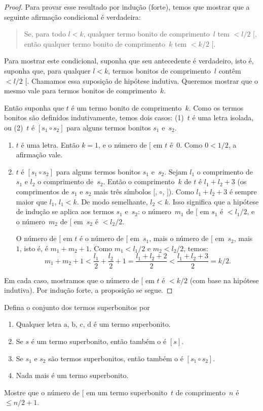 \documentclass[../../../include/open-logic-section]{subfiles}
\begin{document}
\begin{proof}
Para provar esse resultado por indução (forte), temos que mostrar que a
seguinte afirmação condicional é verdadeira:
\begin{quote}
  Se, para todo $l < k$, qualquer termo bonito de comprimento~$l$ tem $< l/2$
  $[$, então qualquer termo bonito de comprimento~$k$ tem $< k/2$ $[$.
\end{quote}
Para mostrar este condicional, suponha que seu antecedente é verdadeiro, isto é,
suponha que, para qualquer $l<k$, termos bonitos de comprimento~$l$ contêm $< l/2$
$[$.  Chamamos essa suposição de hipótese indutiva. Queremos
mostrar que o mesmo vale para termos bonitos de comprimento~$k$.

Então suponha que $t$ é um termo bonito de comprimento~$k$.  Como os termos bonitos são
definidos indutivamente, temos dois casos: (1)~$t$ é uma letra
isolada, ou (2)~$t$ é $[s_1 \circ s_2]$ para alguns termos bonitos $s_1$ e~$s_2$.
\begin{enumerate}
\item $t$ é uma letra.  Então $k = 1$, e o número de $[$ em $t$
é~$0$. Como $0 < 1/2$, a afirmação vale.
\item $t$ é $[s_1 \circ s_2]$ para alguns termos bonitos $s_1$ e~$s_2$.
  Sejam $l_1$ o comprimento de~$s_1$ e $l_2$ o comprimento
  de~$s_2$.  Então o comprimento~$k$ de $t$ é $l_1+l_2+3$ (os comprimentos de
  $s_1$ e $s_2$ mais três símbolos $[$, $\circ$, $]$). Como
  $l_1+l_2+3$ é sempre maior que $l_1$, $l_1 < k$. De modo semelhante, $l_2
  < k$. Isso significa que a hipótese de indução se aplica aos termos
  $s_1$ e~$s_2$: o número~$m_1$ de $[$ em $s_1$ é $< l_1/2$, e
  o número~$m_2$ de $[$ em~$s_2$ é $< l_2/2$.

  O número de $[$ em $t$ é o número de $[$ em~$s_1$, mais o
  número de $[$ em~$s_2$, mais~$1$, isto é, é $m_1 + m_2 + 1$. Como $m_1
  < l_1/2$ e $m_2 < l_2/2$, temos:
  \[
  m_1 + m_2 + 1 < \frac{l_1}{2} + \frac{l_2}{2} + 1 = \frac{l_1+l_2+2}{2} < \frac{l_1+l_2+3}{2} = k/2.
  \]
\end{enumerate}
Em cada caso, mostramos que o número de $[$ em $t$ é $< k/2$ (com
base na hipótese indutiva). Por indução forte, a
proposição se segue.
\end{proof}

\begin{prob}
  Defina o conjunto dos termos superbonitos por
  \begin{enumerate}
  \item Qualquer letra $\mathrm{a}$, $\mathrm{b}$, $\mathrm{c}$,
    $\mathrm{d}$ é um termo superbonito.
  \item Se $s$ é um termo superbonito, então também o é $[s]$.
  \item Se $s_1$ e $s_2$ são termos superbonitos, então também o
    é $[s_1 \circ s_2]$.
  \item Nada mais é um termo superbonito.
  \end{enumerate}
  Mostre que o número de $[$ em um termo superbonito~$t$ de comprimento~$n$ é
    $\le n/2 +1$.
\end{prob}
\end{document}
